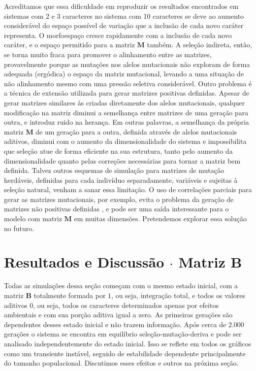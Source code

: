 Acreditamos que essa dificuldade em reproduzir os resultados encontrados
em sistemas com 2 e 3 caracteres no sistema com 10 caracteres se deve ao aumento
considerável do espaço possível de variação que a inclusão de cada novo
caráter representa.
O morfoespaço cresce rapidamente com a inclusão de cada novo caráter, e
o espaço permitido para a matriz $\mathbf{M}$ também.
A seleção indireta, então, se torna muito fraca para promover o
alinhamento entre as matrizes, provavelmente porque as mutações nos
alelos mutacionais não exploram de forma adequada (ergódica) o espaço da
matriz mutacional, levando a uma situação de não alinhamento mesmo com
uma pressão seletiva considerável.
Outro problema é a técnica de extensão utilizada para gerar matrizes
positivas definidas.
Apesar de gerar matrizes similares às criadas diretamente dos alelos
mutacionais, qualquer modificação na matriz diminui a semelhança entre
matrizes de uma geração para outra, e introduz ruido na herança.
Em outras palavras, a semelhança da própria matriz $\mathbf{M}$ de um
geração para a outra, definida através de alelos mutacionais aditivos,
diminui com o aumento da dimensionalidade do sistema e impossibilita que
seleção atue de forma eficiente na sua estrutura, tanto pelo aumento da
dimensionalidade quanto pelas correções necessárias para tornar a matriz
bem definida.
Talvez outros esquemas de simulação para matrizes de mutação herdáveis,
definidas para cada indivíduo separadamente, variáveis e sujeitas à
seleção natural, venham a sanar essa limitação.
O uso de correlações parciais para gerar as matrizes mutacionais, por
exemplo, evita o problema da geração de matrizes não positivas
definidas \citep{Joe2006, Lewandowski2009}, e pode ser uma saída
interessante para o modelo com matriz $\mathbf{M}$ em muitas dimensões.
Pretendemos explorar essa solução no futuro.

\section{Resultados e Discussão $\cdot$ Matriz $\mathbf{B}$}

Todas as simulações dessa seção começam com o mesmo estado inicial, com
a matriz $\mathbf{B}$ totalmente formada por $1$, ou seja, integração total, e
todos os valores aditivos $0$, ou seja, todos os caracteres determinados
apenas por efeitos ambientais e com sua porção aditiva igual a zero.
As primeiras gerações são dependentes desses estado inicial e não trazem
informação.
Após cerca de $2.000$ gerações o sistema se encontra em equilíbrio
seleção-mutação-deriva e pode ser analisado independentemente do estado
inicial.
Isso se reflete em todos os gráficos como um transiente instável, seguido
de estabilidade dependente principalmente do tamanho populacional.
Discutimos esses efeitos e outros na próxima seção.

